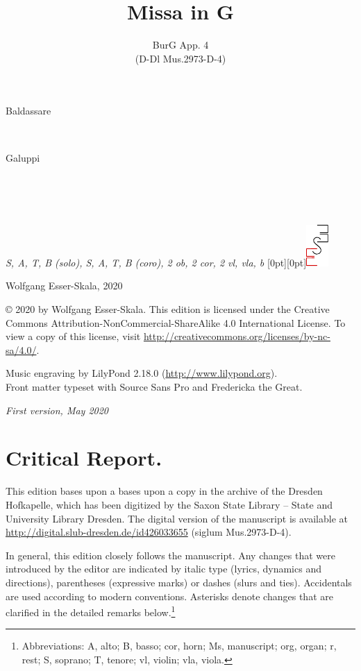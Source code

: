 \documentclass[parskip=full]{scrreprt}
\makeatletter
\DeclareRobustCommand{\sbseries}{\fontseries{sb}\selectfont}
\newcommand\fancytitlehead{
	\headingfont%
	\fontsize{80}{80}\selectfont\textcolor{black!80}{\@lastname.}\\[15pt]%
	\fontsize{60}{60}\selectfont\@ifundefined{@shorttitle}{\@title}{\@shorttitle}.%
}
\def\firstname#1{\def\@firstname{#1}}
\def\lastname#1{\def\@lastname{#1}}
\def\instrumentation#1{\def\@instrumentation{#1}}
\def\maketitle{%
\begin{titlepage}%
	\Large%
	{\@titlehead}%
	\vfill%
	{\strut\@firstname}\\%
	{\sbseries\color{oldred}\strut\@lastname}\\%
	{\strut\@namesuffix}%
	\vfill%
	{\sbseries\@title}\\%
	{\@subtitle}\\[\baselineskip]%
	{\itshape\@instrumentation}%
	\vfill%
	{\itshape\@parts}\hspace*{\fill}\raisebox{0pt}[0pt][0pt]{\includegraphics{ees_logo}}%
\end{titlepage}%
}
\newif\ifprintreport\printreportfalse
\makeatother
\begin{document}
\titlehead{\fancytitlehead}
\firstname{Baldassare}
\lastname{Galuppi}
\title{Missa in G}
\subtitle{BurG App. 4\\(D-Dl Mus.2973-D-4)}
\instrumentation{S, A, T, B (solo), S, A, T, B (coro), 2 ob, 2 cor, 2 vl, vla, b}
\maketitle


\thispagestyle{empty}

\vspace*{\fill}

\hspace*{1em}Wolfgang Esser-Skala, 2020

© 2020 by Wolfgang Esser-Skala. This edition is licensed under the Creative Commons Attribution-NonCommercial-ShareAlike 4.0 International License. To view a copy of this license, visit \url{http://creativecommons.org/licenses/by-nc-sa/4.0/}. 

Music engraving by LilyPond 2.18.0 (\url{http://www.lilypond.org}).\\
Front matter typeset with Source Sans Pro and Fredericka the Great.

\textit{First version, May 2020}

\vspace*{2cm}

\ifprintreport
\chapter*{Critical Report.}

This edition bases upon a bases upon a copy in the archive of the Dresden Hofkapelle, which has been digitized by the Saxon State Library – State and University Library Dresden. The digital version of the manuscript is available at \url{http://digital.slub-dresden.de/id426033655} (siglum Mus.2973-D-4).

In general, this edition closely follows the manuscript. Any changes that were introduced by the editor are indicated by italic type (lyrics, dynamics and directions), parentheses (expressive marks) or dashes (slurs and ties). Accidentals are used according to modern conventions. Asterisks denote changes that are clarified in the detailed remarks below.\footnote{Abbreviations: A, alto; B, basso; cor, horn; Ms, manuscript; org, organ; r, rest; S, soprano; T, tenore; vl, violin; vla, viola.}
\end{document}
